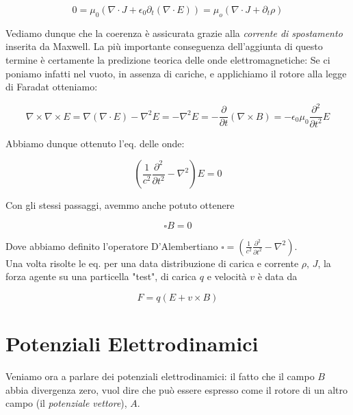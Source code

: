 \documentclass{report}
\begin{document}
\begin{equation}
    0 = \mu_0(\nabla \cdot J + \epsilon_0 \partial_t (\nabla \cdot E)) = \mu_o(\nabla \cdot J + \partial_t \rho )
\end{equation}

Vediamo dunque che la coerenza è assicurata grazie alla \emph{corrente di spostamento} inserita da Maxwell. La più importante conseguenza dell'aggiunta di questo termine è certamente la predizione teorica delle onde elettromagnetiche: Se ci poniamo infatti nel vuoto, in assenza di cariche, e applichiamo il rotore alla legge di Faradat otteniamo: 

\begin{equation}
    \nabla \times \nabla \times E = \nabla(\nabla \cdot E) - \nabla^2E = - \nabla^2E = - \frac{\partial}{\partial t}(\nabla \times B) = - \epsilon_0 \mu_0 \frac{\partial^2}{\partial t^2}E
\end{equation}

Abbiamo dunque ottenuto l'eq. delle onde: 

\begin{tcolorbox}[colback=doc!15, colframe=black, boxrule=1pt]
\begin{equation}
    \left(\frac{1}{c^2}\frac{\partial^2}{\partial t^2} - \nabla^2 \right)E = 0
\end{equation}
\end{tcolorbox}

Con gli stessi passaggi, avemmo anche potuto ottenere 

\begin{tcolorbox}[colback=doc!15, colframe=black, boxrule=1pt]
\begin{equation}
    \square B = 0 
\end{equation}
\end{tcolorbox}

Dove abbiamo definito l'operatore D'Alembertiano $\square = \left(\frac{1}{c^2}\frac{\partial^2}{\partial t^2} - \nabla^2 \right)$. \\

Una volta risolte le eq. per una data distribuzione di carica e corrente $\rho, \, J$, la forza agente su una particella "test", di carica $q$ e velocità $v$ è data da 

\begin{equation}
    F = q(E + v \times B)
\end{equation}

\section{Potenziali Elettrodinamici}
Veniamo ora a parlare dei potenziali elettrodinamici: il fatto che il campo $B$ abbia divergenza zero, vuol dire che può essere espresso come il rotore di un altro campo (il \emph{potenziale vettore}), $A$. \\
\end{document}
